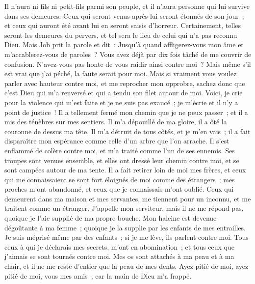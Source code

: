 \begin{multicols}{2}
Il n'aura ni fils ni petit-fils parmi son peuple, et il n'aura personne qui lui survive dans ses demeures.
Ceux qui seront venus après lui seront étonnés de son jour~; et ceux qui auront été avant lui en seront saisis d'horreur.
Certainement, telles seront les demeures du pervers, et tel sera le lieu de celui qui n'a pas reconnu Dieu.
\VerseOne{}Mais Job prit la parole et dit~:
Jusqu'à quand affligerez-vous mon âme et m'accablerez-vous de paroles~?
Vous avez déjà par dix fois tâché de me couvrir de confusion. N'avez-vous pas honte de vous raidir ainsi contre moi~?
Mais même s'il est vrai que j'ai péché, la faute serait pour moi.
Mais si vraiment vous voulez parler avec hauteur contre moi, et me reprocher mon opprobre,
sachez donc que c'est Dieu qui m'a renversé et qui a tendu son filet autour de moi.
Voici, je crie pour la violence qui m'est faite et je ne suis pas exaucé~; je m'écrie et il n'y a point de justice~!
Il a tellement fermé mon chemin que je ne peux passer~; et il a mis des ténèbres sur mes sentiers.
Il m'a dépouillé de ma gloire, il a ôté la couronne de dessus ma tête.
Il m'a détruit de tous côtés, et je m'en vais~; il a fait disparaître mon espérance comme celle d'un arbre que l'on arrache.
Il s'est enflammé de colère contre moi, et m'a traité comme l'un de ses ennemis.
Ses troupes sont venues ensemble, et elles ont dressé leur chemin contre moi, et se sont campées autour de ma tente.
Il a fait retirer loin de moi mes frères, et ceux qui me connaissaient se sont fort éloignés de moi comme des étrangers~;
mes proches m'ont abandonné, et ceux que je connaissais m'ont oublié.
Ceux qui demeurent dans ma maison et mes servantes, me tiennent pour un inconnu, et me traitent comme un étranger.
J'appelle mon serviteur, mais il ne me répond pas, quoique je l'aie supplié de ma propre bouche.
Mon haleine est devenue dégoûtante à ma femme~; quoique je la supplie par les enfants de mes entrailles.
Je suis méprisé même par des enfants~; si je me lève, ils parlent contre moi.
Tous ceux à qui je déclarais mes secrets, m'ont en abomination~; et tous ceux que j'aimais se sont tournés contre moi.
Mes os sont attachés à ma peau et à ma chair, et il ne me reste d'entier que la peau de mes dents.
Ayez pitié de moi, ayez pitié de moi, vous mes amis~; car la main de Dieu m'a frappé.

\end{multicols}
